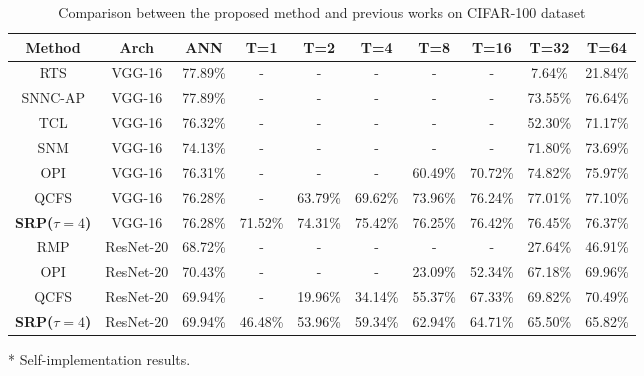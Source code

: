 \documentclass[letterpaper]{article} %
\begin{document}
\begin{table}[t]
    \caption{Comparison between the proposed method and previous works on CIFAR-100 dataset}
    \renewcommand\arraystretch{1.12}
	\centering
        \begin{threeparttable}
	\begin{tabular}{cccccccccc}\hline
	Method & Arch & ANN & T=1 & T=2 & T=4 & T=8 & T=16 & T=32 & T=64\\ \hline

	RTS                    & VGG-16 & 77.89\% & - & - & - & - & - & 7.64\% & 21.84\% \\\hline


	SNNC-AP                & VGG-16 & 77.89\% & - & - & - & - & - & 73.55\% & 76.64\% \\\hline
	TCL\tnote{*}                    & VGG-16 & 76.32\% & - & - & - & - & - & 52.30\% & 71.17\% \\\hline
	SNM                    & VGG-16 & 74.13\% & - & - & - & - & - & 71.80\% & 73.69\% \\\hline
	OPI                    & VGG-16 & 76.31\% & - & - & - & 60.49\% & 70.72\% & 74.82\% & 75.97\%  \\\hline
	QCFS                   & VGG-16 & 76.28\% & - & 63.79\% & 69.62\% & 73.96\% & 76.24\% & 77.01\% & 77.10\% \\\hline

	\textbf{SRP($\tau=4$)} & VGG-16 & 76.28\% & 71.52\% & 74.31\% & 75.42\% & 76.25\% & 76.42\% & 76.45\% & 76.37\% \\ \hline
	RMP                    & ResNet-20 & 68.72\% & - & - & - & - & - & 27.64\% & 46.91\% \\ \hline
	OPI                    & ResNet-20 & 70.43\% & - & - & - & 23.09\% & 52.34\% & 67.18\% & 69.96\%  \\\hline
	QCFS                   & ResNet-20 & 69.94\% & - & 19.96\% & 34.14\% & 55.37\% & 67.33\% & 69.82\% & 70.49\% \\\hline
	\textbf{SRP($\tau=4$)} & ResNet-20 & 69.94\% & 46.48\% & 53.96\% & 59.34\% & 62.94\% & 64.71\% & 65.50\% & 65.82\% \\ \hline
	\end{tabular}
        \begin{tablenotes}
        \footnotesize
        \item[*] Self-implementation results.
        \end{tablenotes}
        \end{threeparttable}
	\label{table02}
\end{table}
\end{document}
